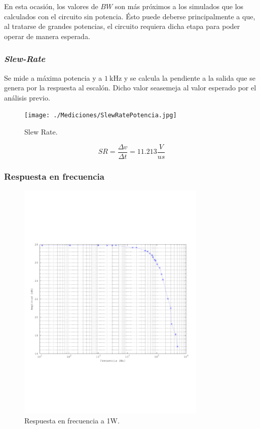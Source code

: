 	En esta ocasión, los valores de $BW$ son más próximos a los simulados que los calculados con el circuito sin potencia. Ésto puede deberse principalmente a que, al tratarse de grandes potencias, el circuito requiera dicha etapa para poder operar de manera esperada.
%
%
	\pagebreak
	
		\subsubsection{\emph{Slew-Rate}}
		Se mide a máxima potencia y a $\SI{1}{\kHz}$ y se calcula la pendiente a la salida que se genera por la respuesta al escalón. Dicho valor seasemeja al valor esperado por el análisis previo.
	

		\begin{figure}[H]
			\centering
			\texttt{[image: ./Mediciones/SlewRatePotencia.jpg]}
			\caption{Slew Rate.}
		\end{figure}

		\begin{equation*}
			SR  = \frac{\varDelta v}{\varDelta t} = 11.213 \frac{V}{us}
		\end{equation*}

		\subsubsection{Respuesta en frecuencia}

		\begin{figure}[H]
			\centering
			\includegraphics[width=0.8\textwidth, trim = 0 160 0 160]{./Figuras/bw_total.pdf}
			\caption{Respuesta en frecuencia a 1W.}
		\end{figure}


